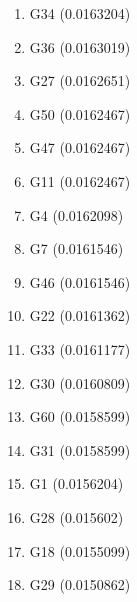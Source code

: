 \begin{enumerate}
\item G34 (0.0163204)
\item G36 (0.0163019)
\item G27 (0.0162651)
\item G50 (0.0162467)
\item G47 (0.0162467)
\item G11 (0.0162467)
\item G4 (0.0162098)
\item G7 (0.0161546)
\item G46 (0.0161546)
\item G22 (0.0161362)
\item G33 (0.0161177)
\item G30 (0.0160809)
\item G60 (0.0158599)
\item G31 (0.0158599)
\item G1 (0.0156204)
\item G28 (0.015602)
\item G18 (0.0155099)
\item G29 (0.0150862)
\end{enumerate}
